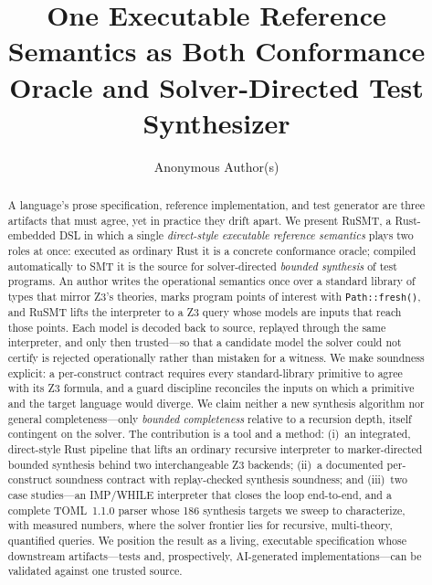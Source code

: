 \documentclass[sigplan,review,anonymous]{acmart}
\theoremstyle{definition}
\theoremstyle{remark}
\newcommand{\rusmt}{RuSMT}
\newcommand{\imp}{IMP}
\newcommand{\toml}{TOML}
\newcommand{\code}[1]{\texttt{#1}}
\begin{document}
\title{One Executable Reference Semantics as Both Conformance Oracle and
Solver-Directed Test Synthesizer}

\author{Anonymous Author(s)}

\begin{abstract}
A language's prose specification, reference implementation, and test generator
are three artifacts that must agree, yet in practice they drift apart. We
present \rusmt{}, a Rust-embedded DSL in which a single \emph{direct-style
executable reference semantics} plays two roles at once: executed as ordinary
Rust it is a concrete conformance oracle; compiled automatically to SMT it is
the source for solver-directed \emph{bounded synthesis} of test programs. An
author writes the operational semantics once over a standard library of types
that mirror Z3's theories, marks program points of interest with
\code{Path::fresh()}, and \rusmt{} lifts the interpreter to a Z3 query whose
models are inputs that reach those points. Each model is decoded back to source,
replayed through the same interpreter, and only then trusted---so that a
candidate model the solver could not certify is rejected operationally rather
than mistaken for a witness. We make soundness explicit: a per-construct
contract requires every standard-library primitive to agree with its Z3 formula,
and a guard discipline reconciles the inputs on which a primitive and the target
language would diverge. We claim neither a new synthesis algorithm nor general
completeness---only \emph{bounded completeness} relative to a recursion depth,
itself contingent on the solver. The contribution is a tool and a method:
(i)~an integrated, direct-style Rust pipeline that lifts an ordinary recursive
interpreter to marker-directed bounded synthesis behind two interchangeable Z3
backends; (ii)~a documented per-construct soundness contract with replay-checked
synthesis soundness; and (iii)~two case studies---an \imp{}/WHILE interpreter
that closes the loop end-to-end, and a complete \toml{}~1.1.0 parser whose 186
synthesis targets we sweep to characterize, with measured numbers, where the
solver frontier lies for recursive, multi-theory, quantified queries. We
position the result as a living, executable specification whose downstream
artifacts---tests and, prospectively, AI-generated implementations---can be
validated against one trusted source.
\end{abstract}
\end{document}
